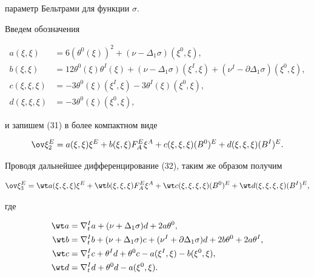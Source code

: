 параметр Бельтрами для функции $\sigma$.





Введем обозначения


\begin{align*}


a(\xi,\xi)&=6(\theta^0(\xi))^2+(\nu-\Delta_1\sigma)


(\xi^0,\xi), \\


b(\xi,\xi)&=12\theta^0(\xi)\theta^I(\xi)+


(\nu-\Delta_1\sigma)(\xi^I,\xi)+


(\nu^I-\partial\Delta_1\sigma)(\xi^0,\xi),\\


c(\xi,\xi,\xi)&=-3\theta^0(\xi)(\xi^I,\xi)-


3\theta^I(\xi)(\xi^0,\xi),\\


d(\xi,\xi,\xi)&=-3\theta^0(\xi)(\xi^0,\xi),


\end{align*}


и запишем (31) в более компактном виде


\begin{equation}


\ov\xi^E_2=a(\xi,\xi)\xi^E+b(\xi,\xi)F^E_A\xi^A+


c(\xi,\xi,\xi)(B^0)^E+d(\xi,\xi,\xi)(B^I)^E.


\end{equation}


Проводя дальнейшее дифференцирование (32), таким же образом получим


\begin{equation}


\ov\xi^E_3=\wt a(\xi,\xi,\xi)\xi^E+\wt b(\xi,\xi,\xi)


F^E_A\xi^A+ \wt c(\xi,\xi,\xi,\xi)(B^0)^E+


\wt d(\xi,\xi,\xi,\xi)(B^I)^E,


\end{equation}


где


\begin{align*}


\wt a&=\nabla^I_t a+(\nu+\Delta_1\sigma)d+2a\theta^0,\\


\wt b&=\nabla^I_t b+(\nu+\Delta_1\sigma)c+


(\nu^I+\partial\Delta_1\sigma)d+2b\theta^0+2a\theta^I, \\


\wt c&=\nabla^I_t c+\theta^I d+\theta^0 c-


a(\xi^I,\xi)-b(\xi^0,\xi), \\


\wt d&=\nabla^I_t d+\theta^0d-a(\xi^0,\xi).


\end{align*}


